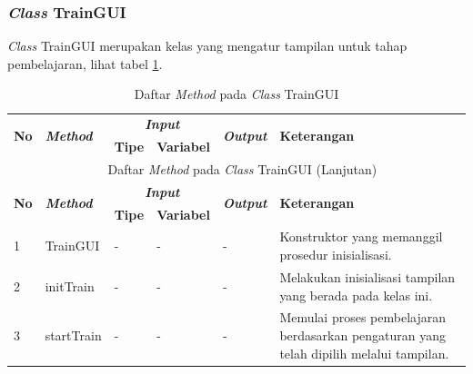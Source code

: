 \subsubsection{\textit{Class} TrainGUI}
\noindent \textit{Class} TrainGUI merupakan kelas yang mengatur tampilan untuk tahap pembelajaran, lihat tabel \ref{tbl:classTrainGUI}.
\begingroup
\setlength{\LTleft}{-20cm plus -1fill}
\setlength{\LTright}{\LTleft}
\begin{small}
\begin{longtable}{|p{0.4cm}|p{2cm}|p{1.8cm}|p{1.8cm}|p{1.7cm}|p{3.55cm}|}
	\caption{Daftar \textit{Method} pada \textit{Class} TrainGUI \label{tbl:classTrainGUI}}\\
	\hline
	\multirow{2}{*}{\textbf{No}} & \multirow{2}{*}{\textit{\textbf{Method}}} & \multicolumn{2}{c|}{\textit{\textbf{Input}}} & \multirow{2}{*}{\textit{\textbf{Output}}} & 
	\multirow{2}{*}{\textbf{Keterangan}}\\
	\cline{3-4}
	& & \textbf{Tipe} & \textbf{Variabel} & & \\
	\endfirsthead
	\multicolumn{6}{c}{\textbf{\tablename~\thetable} Daftar \textit{Method} pada \textit{Class} TrainGUI (Lanjutan)} \\
	\hline
	\multirow{2}{*}{\textbf{No}} & \multirow{2}{*}{\textit{\textbf{Method}}} & \multicolumn{2}{c|}{\textit{\textbf{Input}}} & \multirow{2}{*}{\textit{\textbf{Output}}} & 
	\multirow{2}{*}{\textbf{Keterangan}}\\
	\cline{3-4}
	& & \textbf{Tipe} & \textbf{Variabel} & & \\
	\endhead
	\hline
	1 & TrainGUI & - & - & - & Konstruktor yang memanggil prosedur inisialisasi.\\
	\hline
	2 & initTrain & - & - & - & Melakukan inisialisasi tampilan yang berada pada kelas ini.\\
	\hline
	3 & startTrain & - & - & - & Memulai proses pembelajaran berdasarkan pengaturan yang telah dipilih melalui tampilan.\\
	\hline
\end{longtable}
\end{small}
\endgroup

